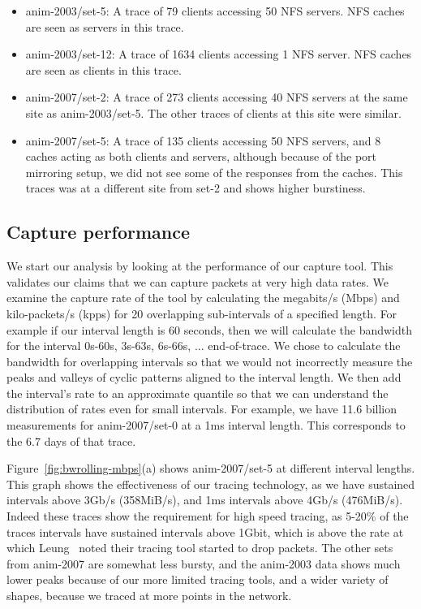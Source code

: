 \begin{itemize}
\item{anim-2003/set-5}: A trace of 79 clients accessing 50 NFS servers.  
NFS caches are seen as servers in this trace.

\item{anim-2003/set-12}: A trace of 1634 clients accessing 1 NFS
server.  NFS caches are seen as clients in this trace.

\item{anim-2007/set-2}: A trace of 273 clients accessing 40 NFS
servers at the same site as anim-2003/set-5.  The other traces of
clients at this site were similar.

\item{anim-2007/set-5}: A trace of 135 clients accessing 50 NFS
servers, and 8 caches acting as both clients and servers, although
because of the port mirroring setup, we did not see some of the
responses from the caches.  This traces was at a different site from
set-2 and shows higher burstiness.
\end{itemize}

\subsection{Capture performance}

We start our analysis by looking at the performance of our capture
tool.  This validates our claims that we can capture packets at very
high data rates.  We examine the capture rate of the tool by
calculating the megabits/s (Mbps) and kilo-packets/s (kpps) for
20 overlapping sub-intervals of a specified length.  For example if our
interval length is 60 seconds, then we will calculate the bandwidth
for the interval 0s-60s, 3s-63s, 6s-66s, ... end-of-trace.  We chose
to calculate the bandwidth for overlapping intervals so that we would not
incorrectly measure the peaks and valleys of cyclic patterns aligned to the interval length.
We then add the
interval's rate to an approximate quantile so that we can understand
the distribution of rates even for small intervals.  For example, we
have 11.6 billion measurements for anim-2007/set-0 at a 1ms interval
length.  This corresponds to the 6.7 days of that trace.

Figure~\ref{fig:bwrolling-mbps}(a) shows anim-2007/set-5 at
different interval lengths.  This graph shows the effectiveness of our
tracing technology, as we have sustained intervals above 3Gb/s
(358MiB/s), and 1ms intervals above 4Gb/s (476MiB/s). Indeed these
traces show the requirement for high speed tracing, as 5-20\% of the
traces intervals have sustained intervals above 1Gbit, which is above
the rate at which Leung~\cite{LeungUsenix08} noted their tracing tool
started to drop packets.  The other sets from anim-2007 are somewhat
less bursty, and the anim-2003 data shows much lower peaks because of
our more limited tracing tools, and a wider variety of shapes, because
we traced at more points in the network.

